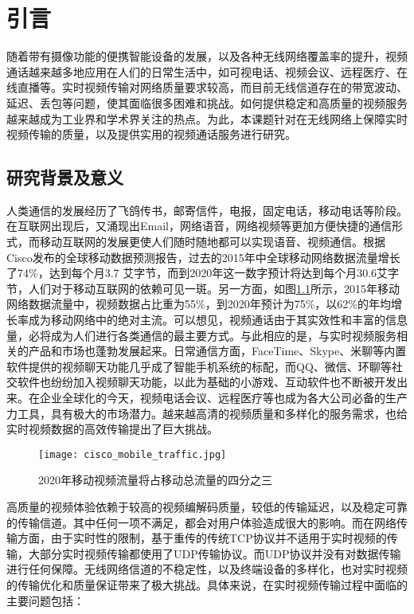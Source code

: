 \chapter{引言}
\label{chap:intro}
随着带有摄像功能的便携智能设备的发展，以及各种无线网络覆盖率的提升，视频通话越来越多地应用在人们的日常生活中，如可视电话、视频会议、远程医疗、在线直播等。实时视频传输对网络质量要求较高，而目前无线信道存在的带宽波动、延迟、丢包等问题，使其面临很多困难和挑战。如何提供稳定和高质量的视频服务越来越成为工业界和学术界关注的热点。为此，本课题针对在无线网络上保障实时视频传输的质量，以及提供实用的视频通话服务进行研究。

\section{研究背景及意义}
人类通信的发展经历了飞鸽传书，邮寄信件，电报，固定电话，移动电话等阶段。在互联网出现后，又涌现出Email，网络语音，网络视频等更加方便快捷的通信形式，而移动互联网的发展更使人们随时随地都可以实现语音、视频通信。根据Cisco发布的全球移动数据预测报告\cite{index2016global}，过去的2015年中全球移动网络数据流量增长了74\%，达到每个月3.7 艾字节，而到2020年这一数字预计将达到每个月30.6艾字节，人们对于移动互联网的依赖可见一斑。另一方面，如图\ref{fig:cisco_mobile}所示，2015年移动网络数据流量中，视频数据占比重为55\%，到2020年预计为75\%，以62\%的年均增长率成为移动网络中的绝对主流。可以想见，视频通话由于其实效性和丰富的信息量，必将成为人们进行各类通信的最主要方式。与此相应的是，与实时视频服务相关的产品和市场也蓬勃发展起来。日常通信方面，FaceTime、Skype、米聊等内置软件提供的视频聊天功能几乎成了智能手机系统的标配，而QQ、微信、环聊等社交软件也纷纷加入视频聊天功能，以此为基础的小游戏、互动软件也不断被开发出来。在企业全球化的今天，视频电话会议、远程医疗等也成为各大公司必备的生产力工具，具有极大的市场潜力。越来越高清的视频质量和多样化的服务需求，也给实时视频数据的高效传输提出了巨大挑战。

\begin{figure}[htbp]
  \centering
  \texttt{[image: cisco\_mobile\_traffic.jpg]}
  \caption{2020年移动视频流量将占移动总流量的四分之三}
  \label{fig:cisco_mobile}
\end{figure}

高质量的视频体验依赖于较高的视频编解码质量，较低的传输延迟，以及稳定可靠的传输信道。其中任何一项不满足，都会对用户体验造成很大的影响。而在网络传输方面，由于实时性的限制，基于重传的传统TCP协议并不适用于实时视频的传输，大部分实时视频传输都使用了UDP传输协议。而UDP协议并没有对数据传输进行任何保障。无线网络信道的不稳定性，以及终端设备的多样化，也对实时视频的传输优化和质量保证带来了极大挑战。具体来说，在实时视频传输过程中面临的主要问题包括：

